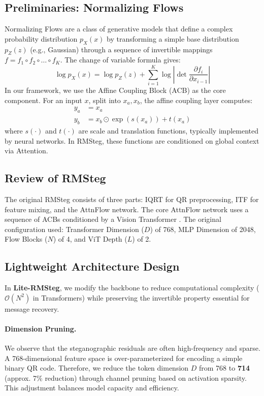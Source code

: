 \documentclass[10pt,twocolumn,letterpaper]{article}
\begin{document}
\subsection{Preliminaries: Normalizing Flows}
Normalizing Flows are a class of generative models that define a complex probability distribution $p_X(x)$ by transforming a simple base distribution $p_Z(z)$ (e.g., Gaussian) through a sequence of invertible mappings $f = f_1 \circ f_2 \circ \dots \circ f_K$. The change of variable formula gives:
\begin{equation}
    \log p_X(x) = \log p_Z(z) + \sum_{i=1}^{K} \log \left| \det \frac{\partial f_i}{\partial x_{i-1}} \right|
\end{equation}
In our framework, we use the Affine Coupling Block (ACB) as the core component. For an input $x$, split into $x_a, x_b$, the affine coupling layer computes:
\begin{equation}
    \begin{aligned}
    y_a &= x_a \\
    y_b &= x_b \odot \exp(s(x_a)) + t(x_a)
    \end{aligned}
\end{equation}
where $s(\cdot)$ and $t(\cdot)$ are scale and translation functions, typically implemented by neural networks. In RMSteg, these functions are conditioned on global context via Attention.

\subsection{Review of RMSteg}
The original RMSteg consists of three parts: IQRT for QR preprocessing, ITF for feature mixing, and the AttnFlow network. The core AttnFlow network uses a sequence of ACBs conditioned by a Vision Transformer \cite{vit}. The original configuration used:
Transformer Dimension ($D$) of 768, MLP Dimension of 2048, Flow Blocks ($N$) of 4, and ViT Depth ($L$) of 2.

\subsection{Lightweight Architecture Design}
In \textbf{Lite-RMSteg}, we modify the backbone to reduce computational complexity ($\mathcal{O}(N^2)$ in Transformers) while preserving the invertible property essential for message recovery.

\paragraph{Dimension Pruning.} We observe that the steganographic residuals are often high-frequency and sparse. A 768-dimensional feature space is over-parameterized for encoding a simple binary QR code. Therefore, we reduce the token dimension $D$ from 768 to \textbf{714} (approx. 7\% reduction) through channel pruning based on activation sparsity. This adjustment balances model capacity and efficiency.
\end{document}
